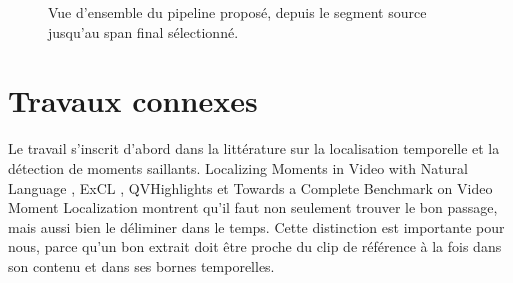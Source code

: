\begin{figure}[ht]
\centering
{}
\ArrowSeparator
{}
\ArrowSeparator
{}
\ArrowSeparator
{}
\caption{Vue d'ensemble du pipeline propos\'e, depuis le segment source jusqu'au span final s\'electionn\'e.}
\label{fig:pipeline-overview}
\end{figure}

\section{Travaux connexes}

Le travail s'inscrit d'abord dans la litt\'erature sur la localisation temporelle et la d\'etection de moments saillants. Localizing Moments in Video with Natural Language \cite{anonymous2017_localizing}, ExCL \cite{ghosh2019_excl}, QVHighlights \cite{lei2021_moments} et Towards a Complete Benchmark on Video Moment Localization \cite{chae2024_benchmark} montrent qu'il faut non seulement trouver le bon passage, mais aussi bien le d\'eliminer dans le temps. Cette distinction est importante pour nous, parce qu'un bon extrait doit \^etre proche du clip de r\'ef\'erence \`a la fois dans son contenu et dans ses bornes temporelles.

